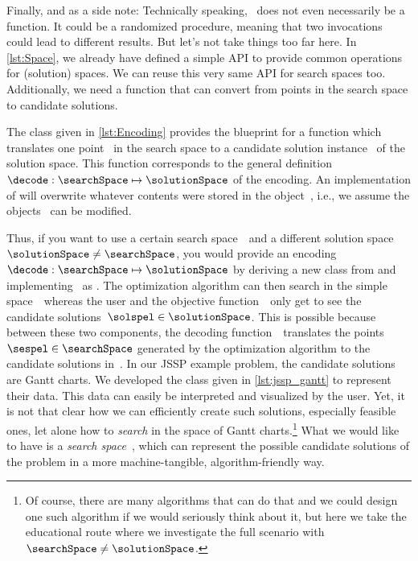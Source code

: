 Finally, and as a side note:
Technically speaking, \decode\ does not even necessarily be a function.
It could be a randomized procedure, meaning that two invocations could lead to different results.
But let's not take things too far here.%
%
\endhsection%
%
%
%
In \autoref{lst:Space}, we already have defined a simple API to provide common operations for (solution) spaces.
We can reuse this very same API for search spaces too.
Additionally, we need a function that can convert from points in the search space to candidate solutions.%
%
%

The class given in \autoref{lst:Encoding} provides the blueprint for a function  which translates one point~ in the search space to a candidate solution instance~ of the solution space.
This  function corresponds to the general definition~$\decode:\searchSpace\mapsto\solutionSpace$ of the encoding.
An implementation of  will overwrite whatever contents were stored in the object~, i.e., we assume the objects~ can be modified.

Thus, if you want to use a certain search space~\searchSpace\ and a different solution space~$\solutionSpace\neq\searchSpace$, you would provide an encoding~$\decode:\searchSpace\mapsto\solutionSpace$ by deriving a new class from  and implementing \decode\ as .
The optimization algorithm can then search in the simple space~\searchSpace\ whereas the user and the objective function~\objf\ only get to see the candidate solutions~$\solspel\in\solutionSpace$.
This is possible because between these two components, the decoding function~\decode\ translates the points~$\sespel\in\searchSpace$ generated by the optimization algorithm to the candidate solutions in~\solutionSpace.%
%
\endhsection%
%
%
\label{sec:jsspSearchSpace}%
%
In our \gls{JSSP} example problem, the candidate solutions are Gantt charts.
We developed the class  given in \autoref{lst:jssp_gantt} to represent their data.
This data can easily be interpreted and visualized by the user.
Yet, it is not that clear how we can efficiently create such solutions, especially feasible ones, let alone how to \emph{search} in the space of Gantt charts.\footnote{%
Of course, there are many algorithms that can do that and we could design one such algorithm if we would seriously think about it, but here we take the educational route where we investigate the full scenario with~$\searchSpace\neq\solutionSpace$.} %
What we would like to have is a \emph{search space}~\searchSpace, which can represent the possible candidate solutions of the problem in a more machine-tangible, algorithm-friendly way.

